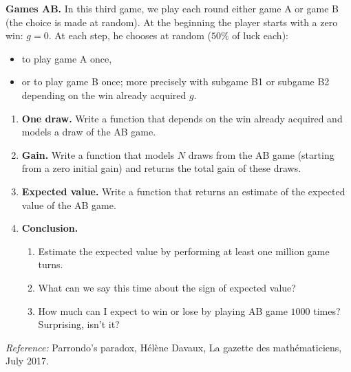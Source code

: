 \documentclass[11pt,class=report,crop=false]{standalone}
\begin{document}


\begin{activite}


\textbf{Games AB.} In this third game, we play each round either game A or game B (the choice is made at random). 
At the beginning the player starts with a zero win: $g=0$. 
At each step, he chooses at random ($50\%$ of luck each):
\begin{itemize}
  \item to play game A once,
  \item or to play game B once; more precisely with subgame B1 or subgame B2 depending on the win already acquired $g$.
\end{itemize}

\begin{enumerate}
  \item \textbf{One draw.}
  Write a  function that depends on the win already acquired and models a draw of the AB game.
  
  \item \textbf{Gain.} Write a function  that models $N$ draws from the AB game (starting from a zero initial gain) and returns the total gain of these draws.
  
  \item \textbf{Expected value.} Write a function  that returns an estimate of the expected value of the AB game.
  
  \item \textbf{Conclusion.}
  \begin{enumerate}
    \item Estimate the expected value by performing at least one million game turns.
    \item What can we say this time about the sign of expected value?
    \item How much can I expect to win or lose by playing AB game $1000$ times? Surprising, isn't it?
  \end{enumerate}

\end{enumerate}
\end{activite}


\emph{Reference: } \og{}Parrondo's paradox\fg{}, Hélène Davaux, La gazette des mathématiciens, July 2017.
\end{document}

